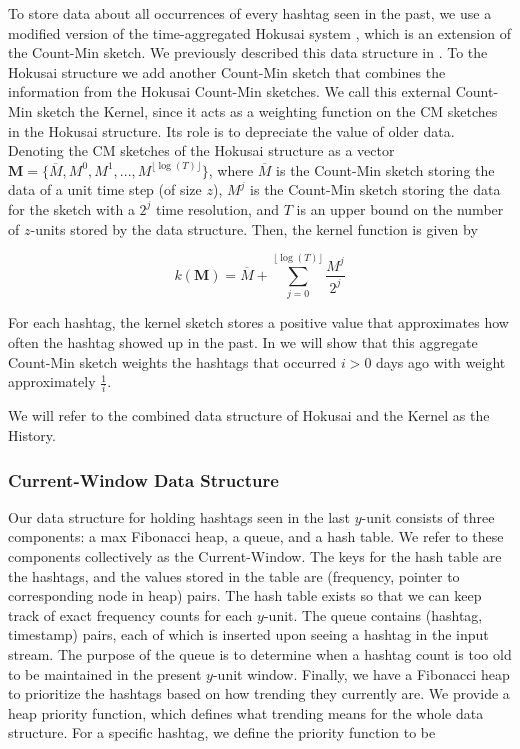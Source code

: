 \documentclass[twoside]{article}
\newcommand{\nref}[1]
 {\textbf{\nameref{#1}}}
\newcommand{\cc}[1]
 {\textbf{\cite{#1}}}
\begin{document}
{To store data about all occurrences of every hashtag seen in the past, we use a modified version of the time-aggregated Hokusai system \cc{Matusevych:2012}, which is an extension of the Count-Min sketch. We previously described this data structure in \nref{sec:PreviousWork}. 
To the Hokusai structure we add another Count-Min sketch that combines the information from the Hokusai Count-Min sketches. We call this external Count-Min sketch the Kernel, since it acts as a weighting function on the CM sketches in the Hokusai structure. Its role is to depreciate the value of older data.
Denoting the CM sketches of the Hokusai structure as a vector $\textbf{M} = \{\overline{M}, M^0, M^1, ..., M^{{\lfloor {\log(T)} \rfloor}}\}$, where $\overline{M}$ is the Count-Min sketch storing the data of a unit time step (of size $z$), $M^j$ is the Count-Min sketch storing the data for the sketch with a $2^j$ time resolution, and $T$ is an upper bound on the number of $z$-units stored by the data structure. Then, the kernel function is given by

\begin{equation} 
\label{eq:kernel}
\textit{k}(\textbf{M}) = \overline{M} + \sum\limits_{j=0}^{{\lfloor \log⁡(T) \rfloor}} \frac{M^j}{2^j}
\end{equation}

For each hashtag, the kernel sketch stores a positive value that approximates how often the hashtag showed up in the past. In \nref{sec:Correctness} we will show that this aggregate Count-Min sketch weights the hashtags that occurred $i > 0$ days ago with weight approximately $\frac{1}{i}$.

We will refer to the combined data structure of Hokusai and the Kernel as the History.

\subsubsection{Current-Window Data Structure}

Our data structure for holding hashtags seen in the last $y$-unit consists of three components: a max Fibonacci heap, a queue, and a hash table.  We refer to these components collectively as the Current-Window.
The keys for the hash table are the hashtags, and the values stored in the table are (frequency, pointer to corresponding node in heap) pairs. The hash table exists so that we can keep track of exact frequency counts for each $y$-unit.
The queue contains (hashtag, timestamp) pairs, each of which is inserted upon seeing a hashtag in the input stream. The purpose of the queue is to determine when a hashtag count is too old to be maintained in the present $y$-unit window.
Finally, we have a Fibonacci heap to prioritize the hashtags based on how trending they currently are.
We provide a heap priority function, which defines what trending means for the whole data structure. 
For a specific hashtag, we define the priority function to be

}
\end{document}
